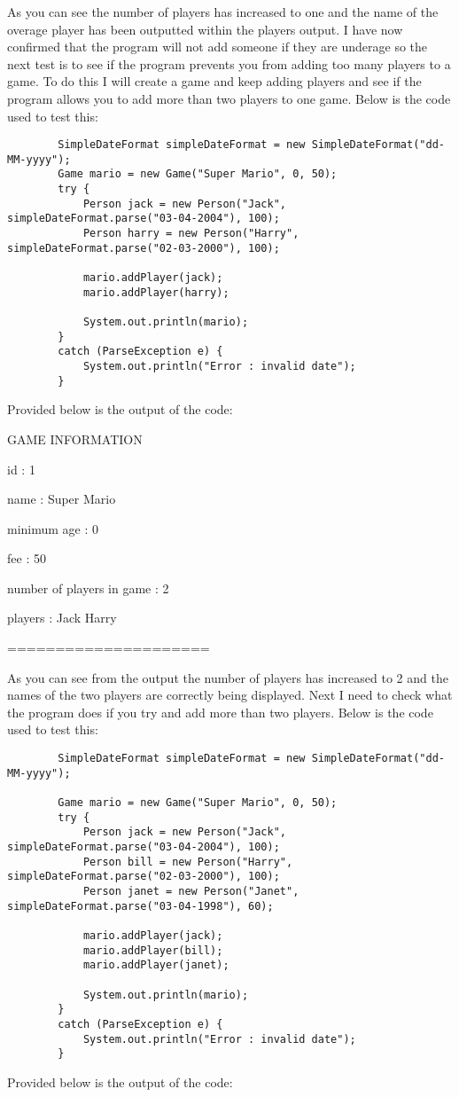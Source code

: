 \documentclass[a4paper]{article}
\begin{document}
As you can see the number of players has increased to one and the name of the overage player has been outputted within the players output. I have now confirmed that the program will not add someone if they are underage so the next test is to see if the program prevents you from adding too many players to a game. To do this I will create a game and keep adding players and see if the program allows you to add more than two players to one game. Below is the code used to test this: \begin{lstlisting}
		SimpleDateFormat simpleDateFormat = new SimpleDateFormat("dd-MM-yyyy");
		Game mario = new Game("Super Mario", 0, 50);
        try {
            Person jack = new Person("Jack", simpleDateFormat.parse("03-04-2004"), 100);
            Person harry = new Person("Harry", simpleDateFormat.parse("02-03-2000"), 100);

            mario.addPlayer(jack);
            mario.addPlayer(harry);

            System.out.println(mario);
        }
        catch (ParseException e) {
            System.out.println("Error : invalid date");
        }
\end{lstlisting}
Provided below is the output of the code: \newline

\noindent GAME INFORMATION

\noindent id : 1

\noindent name : Super Mario

\noindent minimum age : 0

\noindent fee : 50

\noindent number of players in game : 2

\noindent players : Jack Harry 

\noindent =====================\newline

As you can see from the output the number of players has increased to 2 and the names of the two players are correctly being displayed. Next I need to check what the program does if you try and add more than two players. Below is the code used to test this: \begin{lstlisting}
		SimpleDateFormat simpleDateFormat = new SimpleDateFormat("dd-MM-yyyy");

        Game mario = new Game("Super Mario", 0, 50);
        try {
            Person jack = new Person("Jack", simpleDateFormat.parse("03-04-2004"), 100);
            Person bill = new Person("Harry", simpleDateFormat.parse("02-03-2000"), 100);
            Person janet = new Person("Janet", simpleDateFormat.parse("03-04-1998"), 60);

            mario.addPlayer(jack);
            mario.addPlayer(bill);
            mario.addPlayer(janet);

            System.out.println(mario);
        }
        catch (ParseException e) {
            System.out.println("Error : invalid date");
        }
\end{lstlisting}
Provided below is the output of the code: \newline
\end{document}
